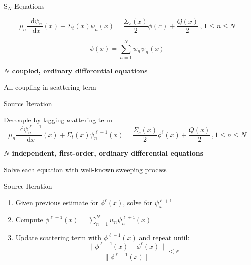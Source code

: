 \documentclass[10pt]{beamer}
\newcommand{\SN}{S$_N$\xspace}
\newcommand{\ud}{\mathop{}\!\mathrm{d}} %
\newcommand{\dderiv}[2]{\frac{\ud #1}{\ud #2}}
\begin{document}
\begin{frame}{\SN Equations}

    \begin{equation*}
        \mu_n \dderiv{\psi_n}{x}(x) + \Sigma_t(x) \psi_n(x) = 
        \frac{\Sigma_s(x)}{2} \phi(x) + \frac{Q(x)}{2} \,, \, 1 \leq n \leq N
    \end{equation*}

    \begin{equation*}
        \phi(x) = \sum_{n=1}^N w_n \psi_n(x)
    \end{equation*}

    \textbf{$N$ coupled, ordinary differential equations}

    All coupling in scattering term 

\end{frame}

\begin{frame}{Source Iteration}

    Decouple by lagging scattering term 
    \begin{equation*}
        \mu_n \dderiv{\psi_n^{\ell+1}}{x}(x) + \Sigma_t(x) \psi_n^{\ell+1}(x) = 
        \frac{\Sigma_s(x)}{2} \phi^{\ell}(x) + \frac{Q(x)}{2} \,, 1 \leq n \leq N        
    \end{equation*}

    \textbf{$N$ independent, first-order, ordinary differential equations}

    Solve each equation with well-known sweeping process 

    \begin{exampleblock}{Source Iteration}
    \begin{enumerate}
        \item Given previous estimate for $\phi^{\ell}(x)$, solve for $\psi_n^{\ell+1}$

        \item Compute $\phi^{\ell+1}(x) = 
            \sum_{n=1}^N w_n \psi_n^{\ell+1}(x)$ 

        \item Update scattering term with $\phi^{\ell+1}(x)$ and repeat until: 
             \begin{equation*}
                \frac{\|\phi^{\ell+1}(x) - \phi^{\ell}(x)\|}{\|\phi^{\ell+1}(x)\|} < \epsilon 
             \end{equation*}

    \end{enumerate}
    \end{exampleblock}

\end{frame}
\end{document}
